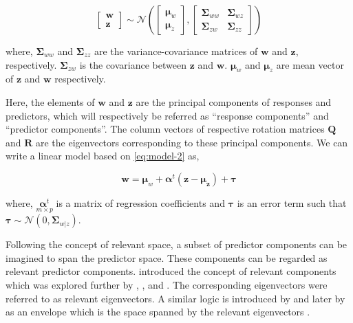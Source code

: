 \documentclass[12pt,3p,authoryear]{elsarticle}
\begin{document}
\begin{equation}
  \begin{bmatrix}
    \mathbf{w} \\ \mathbf{z}
  \end{bmatrix} \sim \mathcal{N}
  \left(
    \begin{bmatrix}
      \boldsymbol{\mu}_w \\
      \boldsymbol{\mu}_z
    \end{bmatrix},
    \begin{bmatrix}
    \boldsymbol{\Sigma}_{ww} & \boldsymbol{\Sigma}_{wz} \\
    \boldsymbol{\Sigma}_{zw} & \boldsymbol{\Sigma}_{zz}
    \end{bmatrix}
  \right)
  \label{eq:model-2}
\end{equation}

where, \(\boldsymbol{\Sigma}_{ww}\) and \(\boldsymbol{\Sigma}_{zz}\) are
the variance-covariance matrices of \(\mathbf{w}\) and \(\mathbf{z}\),
respectively. \(\boldsymbol{\Sigma}_{zw}\) is the covariance between
\(\mathbf{z}\) and \(\mathbf{w}\). \(\boldsymbol{\mu}_w\) and
\(\boldsymbol{\mu}_z\) are mean vector of \(\mathbf{z}\) and
\(\mathbf{w}\) respectively.

Here, the elements of \(\mathbf{w}\) and \(\mathbf{z}\) are the
principal components of responses and predictors, which will
respectively be referred as ``response components'' and ``predictor
components''. The column vectors of respective rotation matrices
\(\mathbf{Q}\) and \(\mathbf{R}\) are the eigenvectors corresponding to
these principal components. We can write a linear model based on
\eqref{eq:model-2} as,

\begin{equation}
\mathbf{w} = \boldsymbol{\mu}_w + \boldsymbol{\alpha}^t(\mathbf{z} - \boldsymbol{\mu_z}) + \boldsymbol{\tau}
\label{eq:reg-model-2}
\end{equation}

where, \(\underset{m\times p}{\boldsymbol{\alpha}^t}\) is a matrix of
regression coefficients and \(\boldsymbol{\tau}\) is an error term such
that
\(\boldsymbol{\tau} \sim \mathcal{N}(0, \boldsymbol{\Sigma}_{w|z})\).

Following the concept of relevant space, a subset of predictor
components can be imagined to span the predictor space. These components
can be regarded as relevant predictor components. \citet{Naes1985}
introduced the concept of relevant components which was explored further
by \citet{helland1990partial}, \citet{naes1993relevant},
\citet{Helland1994b} and \citet{Helland2000}. The corresponding
eigenvectors were referred to as relevant eigenvectors. A similar logic
is introduced by \citet{cook2010envelope} and later by
\citet{cook2013envelopes} as an envelope which is the space spanned by
the relevant eigenvectors \citep[pp.~101]{cook2018envelope}.
\end{document}
